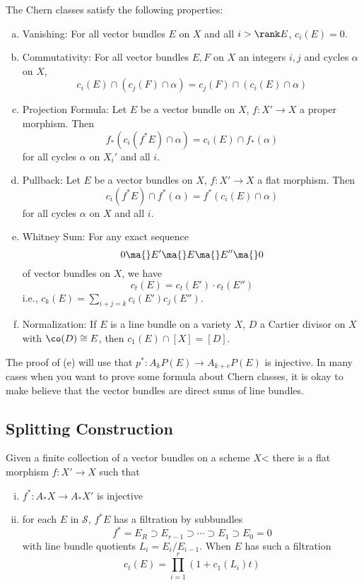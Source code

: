 \begin{thmm}
The Chern classes satisfy the following properties:
\begin{enumerate}[(a)]
\item Vanishing: For all vector bundles $E$ on $X$ and all $i>\rank E$, $c_i(E)=0$.
\item Commutativity: For all vector bundles $E,F$ on $X$ an integers $i,j$ and cycles $\alpha$ on $X$, 
	\[
	c_i(E) \cap (c_j(F) \cap \alpha)= c_j(F) \cap (c_i(E) \cap \alpha)
	\]
\item Projection Formula: Let $E$ be a vector bundle on $X$, $f: X' \to X$ a proper morphism. Then
	\[
	f_*(c_i(f^*E) \cap \alpha)= c_i(E) \cap f_*(\alpha)
	\]
for all cycles $\alpha$ on $X_i'$ and all $i$.
\item Pullback: Let $E$ be a vector bundles on $X$, $f: X' \to X$ a flat morphism. Then 
	\[
	c_i(f^*E) \cap f^*(\alpha)= f^*(c_i(E) \cap \alpha)
	\]
for all cycles $\alpha$ on $X$ and all $i$.
\item Whitney Sum: For any exact sequence
	\[
	0 \ma{} E' \ma{} E \ma{} E'' \ma{} 0
	\]
of vector bundles on $X$, we have
	\[
	c_t(E) = c_t(E') \cdot c_t(E'')
	\]
i.e., $c_k(E)= \sum_{i+j=k} c_i(E') c_j(E'')$. 
\item Normalization: If $E$ is a line bundle on a variety $X$, $D$ a Cartier divisor on $X$ with $\co(D) \cong E$, then $c_1(E) \cap [X]=[D]$. 
\end{enumerate}
\end{thmm}

The proof of (e) will use that $p^*: A_kP(E) \to A_{k+e}P(E)$ is injective. In many cases when you want to prove some formula about Chern classes, it is okay to make believe that the vector bundles are direct sums of line bundles. 


\subsection{Splitting Construction}


Given a finite collection of a vector bundles on a scheme $X$< there is a flat morphism $f: X' \to X$ such that 
\begin{enumerate}[(i)]
\item $f^*: A_*X \to A_*X'$ is injective
\item for each $E$ in $\mathcal{S}$, $f^*E$ has a filtration by subbundles
	\[
	f^*=E_R \supset E_{r-1} \supset \cdots \supset E_1 \supset E_0=0
	\]
with line bundle quotients $L_i=E_i/E_{i-1}$. When $E$ has such a filtration 
	\[
	c_t(E)= \prod_{i=1}^r (1+c_1(L_i)t)
	\]
\end{enumerate}

